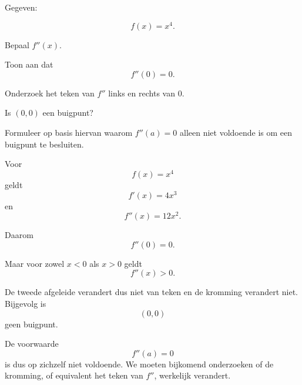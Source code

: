 \documentclass{ximera}
\begin{document}
\begin{oefening}[$f''(a)=0$ volstaat niet]{\oefB\ESS}

Gegeven:

\[
f(x)=x^4.
\]

\begin{question}
Bepaal $f''(x)$.
\end{question}

\begin{question}
Toon aan dat
\[
f''(0)=0.
\]
\end{question}

\begin{question}
Onderzoek het teken van $f''$ links en rechts van $0$.
\end{question}

\begin{question}
Is $(0,0)$ een buigpunt?
\end{question}

\begin{question}
Formuleer op basis hiervan waarom $f''(a)=0$ alleen
niet voldoende is om een buigpunt te besluiten.
\end{question}

\begin{oplossing}

Voor
\[
f(x)=x^4
\]
geldt
\[
f'(x)=4x^3
\]
en
\[
f''(x)=12x^2.
\]

Daarom
\[
f''(0)=0.
\]

Maar voor zowel $x<0$ als $x>0$ geldt
\[
f''(x)>0.
\]

De tweede afgeleide verandert dus niet van teken en de kromming verandert
niet. Bijgevolg is
\[
(0,0)
\]
geen buigpunt.

De voorwaarde
\[
f''(a)=0
\]
is dus op zichzelf niet voldoende. We moeten bijkomend onderzoeken of de
kromming, of equivalent het teken van $f''$, werkelijk verandert.

\end{oplossing}

\end{oefening}


\end{document}
